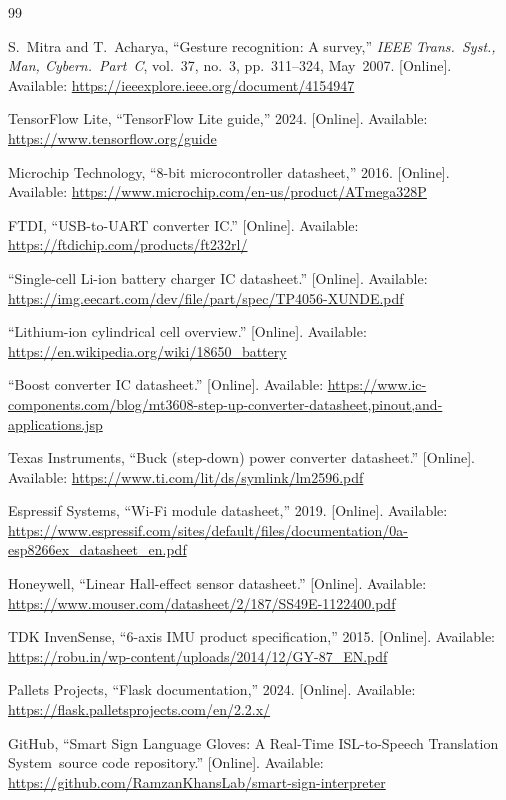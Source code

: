 \documentclass[conference]{IEEEtran}
\newcommand{\SystemName}{Smart Sign Language Gloves: A Real-Time ISL-to-Speech Translation System}
\newcommand{\CodeRepoUrl}{https://github.com/RamzanKhansLab/smart-sign-interpreter}
\begin{document}
\begin{thebibliography}{99}

S.~Mitra and T.~Acharya,
``Gesture recognition: A survey,''
\textit{IEEE Trans.\ Syst., Man, Cybern.\ Part~C},
vol.~37, no.~3, pp.~311--324, May~2007.
[Online]. Available: \url{https://ieeexplore.ieee.org/document/4154947}

TensorFlow Lite,
``TensorFlow Lite guide,'' 2024.
[Online]. Available: \url{https://www.tensorflow.org/guide}

Microchip Technology,
``8-bit microcontroller datasheet,'' 2016.
[Online]. Available: \url{https://www.microchip.com/en-us/product/ATmega328P}

FTDI, ``USB-to-UART converter IC.''
[Online]. Available: \url{https://ftdichip.com/products/ft232rl/}

``Single-cell Li-ion battery charger IC datasheet.''
[Online]. Available:
\url{https://img.eecart.com/dev/file/part/spec/TP4056-XUNDE.pdf}

``Lithium-ion cylindrical cell overview.''
[Online]. Available: \url{https://en.wikipedia.org/wiki/18650_battery}

``Boost converter IC datasheet.''
[Online]. Available:
\url{https://www.ic-components.com/blog/mt3608-step-up-converter-datasheet,pinout,and-applications.jsp}

Texas Instruments,
``Buck (step-down) power converter datasheet.''
[Online]. Available: \url{https://www.ti.com/lit/ds/symlink/lm2596.pdf}

Espressif Systems,
``Wi-Fi module datasheet,'' 2019.
[Online]. Available:
\url{https://www.espressif.com/sites/default/files/documentation/0a-esp8266ex_datasheet_en.pdf}

Honeywell,
``Linear Hall-effect sensor datasheet.''
[Online]. Available:
\url{https://www.mouser.com/datasheet/2/187/SS49E-1122400.pdf}

TDK InvenSense,
``6-axis IMU product specification,'' 2015.
[Online]. Available:
\url{https://robu.in/wp-content/uploads/2014/12/GY-87_EN.pdf}

Pallets Projects,
``Flask documentation,'' 2024.
[Online]. Available: \url{https://flask.palletsprojects.com/en/2.2.x/}

GitHub, ``\SystemName\ source code repository.''
[Online]. Available: \url{\CodeRepoUrl}

\end{thebibliography}
\end{document}
